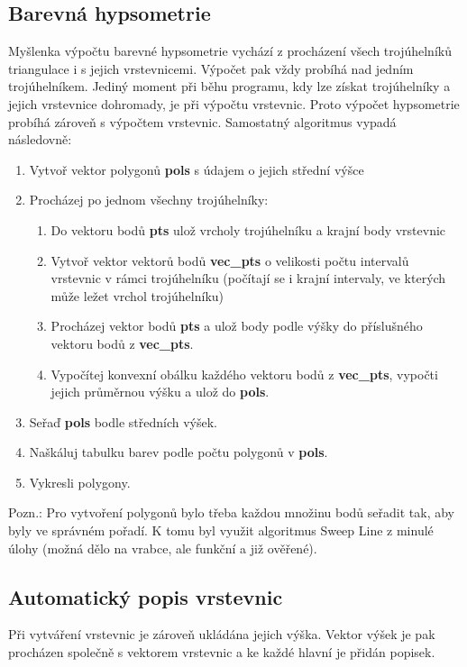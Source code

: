 \documentclass[a4paper, 12pt]{article}
\begin{document}
\subsection{Barevná hypsometrie}
Myšlenka výpočtu barevné hypsometrie vychází z procházení všech trojúhelníků triangulace i s jejich vrstevnicemi. Výpočet pak vždy probíhá nad jedním trojúhelníkem. Jediný moment při běhu programu, kdy lze získat trojúhelníky a jejich vrstevnice dohromady, je při výpočtu vrstevnic. Proto výpočet hypsometrie probíhá zároveň s výpočtem vrstevnic. Samostatný algoritmus vypadá následovně:

\begin{enumerate}
	\item Vytvoř vektor polygonů \textbf{pols} s údajem o jejich střední výšce
	\item Procházej po jednom všechny trojúhelníky:
		\begin{enumerate}
			\item Do vektoru bodů \textbf{pts} ulož vrcholy trojúhelníku a krajní body vrstevnic
			\item Vytvoř vektor vektorů bodů \textbf{vec\_pts} o velikosti počtu intervalů vrstevnic v rámci trojúhelníku (počítají se i krajní intervaly, ve kterých může ležet vrchol trojúhelníku)
			\item Procházej vektor bodů \textbf{pts} a ulož body podle výšky do příslušného vektoru bodů z \textbf{vec\_pts}.
			\item Vypočítej konvexní obálku každého vektoru bodů z \textbf{vec\_pts}, vypočti jejich průměrnou výšku a ulož do \textbf{pols}. 
		\end{enumerate}
	\item Seřaď \textbf{pols} bodle středních výšek.
	\item Naškáluj tabulku barev podle počtu polygonů v \textbf{pols}.
	\item Vykresli polygony.
\end{enumerate}

Pozn.: Pro vytvoření polygonů bylo třeba každou množinu bodů seřadit tak, aby byly ve správném pořadí. K tomu byl využit algoritmus Sweep Line z minulé úlohy (možná dělo na vrabce, ale funkční a již ověřené).

\subsection{Automatický popis vrstevnic}
Při vytváření vrstevnic je zároveň ukládána jejich výška. Vektor výšek je pak procházen společně s vektorem vrstevnic a ke každé hlavní je přidán popisek.
\end{document}
